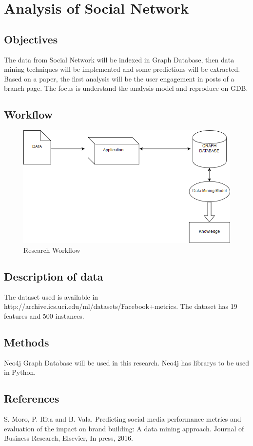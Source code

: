 \section{Analysis of Social Network}\label{analysis-of-social-network}

\subsection{Objectives}\label{objectives}

The data from Social Network will be indexed in Graph Database, then
data mining techniques will be implemented and some predictions will be
extracted. Based on a paper, the first analysis will be the user
engagement in posts of a branch page. The focus is understand the
analysis model and reproduce on GDB.

\subsection{Workflow}\label{workflow}

\begin{figure}
\centering
\includegraphics{../figures/research.png}
\caption{Research Workflow}
\end{figure}

\subsection{Description of data}\label{description-of-data}

The dataset used is available in
http://archive.ics.uci.edu/ml/datasets/Facebook+metrics. The dataset has
19 features and 500 instances.

\subsection{Methods}\label{methods}

Neo4j Graph Database will be used in this research. Neo4j has librarys
to be used in Python.

\subsection{References}\label{references}

S. Moro, P. Rita and B. Vala. Predicting social media performance
metrics and evaluation of the impact on brand building: A data mining
approach. Journal of Business Research, Elsevier, In press, 2016.
